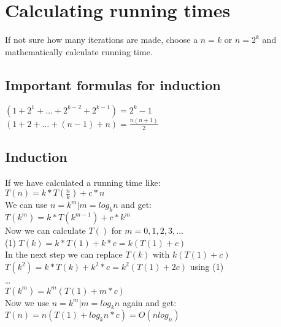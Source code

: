 \documentclass[12pt]{article}
\begin{document}
\section*{Calculating running times}
If not sure how many iterations are made, choose a $n = k$ or $n = 2^k$ and mathematically calculate running time.
\subsection*{Important formulas for induction}
$(1+2^1+\dots+2^{k-2}+2^{k-1}) = 2^k-1$\\
$(1+2+\dots+(n-1)+n) = \frac{n(n+1)}{2}$\\
\subsection*{Induction}
If we have calculated a running time like:\\
$T(n)=k*T(\frac{n}{k})+c*n$\\
We can use $n=k^m | m=log_kn$ and get:\\
$T(k^m)=k*T(k^{m-1})+c*k^m$\\
Now we can calculate $T()$ for $m=0,1,2,3,\dots$\\
(1) $T(k)=k*T(1)+k*c=k(T(1)+c)$\\
In the next step we can replace $T(k)$ with $k(T(1)+c)$\\
$T(k^2)=k*T(k)+k^2*c=k^2(T(1)+2c)$ using (1)\\
\dots\\
$T(k^m)=k^m(T(1)+m*c)$\\
Now we use $n=k^m | m=log_kn$ again and get:\\
$T(n)=n(T(1)+log_kn*c) = O(nlog_n)$
\end{document}
